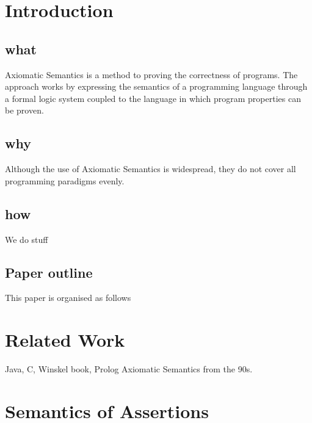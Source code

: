 



\section{Introduction}
\label{sec:intro}


\subsection{what}

Axiomatic Semantics is a method to proving the correctness of
programs.
%
The approach works by expressing the semantics of a programming language
through a formal logic system coupled to the language in which program
properties can be proven.



\subsection{why}

Although the use of Axiomatic Semantics is widespread, they do not cover
all programming paradigms evenly.



\subsection{how}

We do stuff


\subsection{Paper outline}
This paper is organised as follows


\section{Related Work}
\label{sec:rel-work}

Java, C, Winskel book, Prolog Axiomatic Semantics from the 90s.


\section{Semantics of Assertions}
\label{sec:sem-ass}

